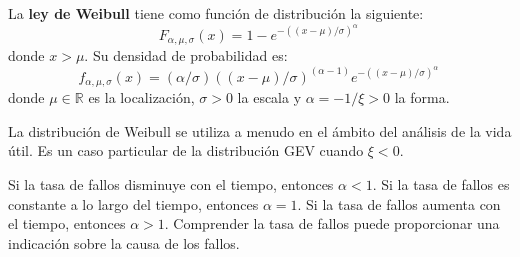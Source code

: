 \begin{f}
	
	
	La \textbf{ley de Weibull} tiene como función de distribución la siguiente:
	\[
	F_{\alpha,\mu, \sigma}(x) = 1- e^{-((x-\mu)/\sigma)^\alpha}\,
	\]
	donde \(x >\mu\).
	Su densidad de probabilidad es:
	\[
	f_{\alpha,\mu,\sigma}(x) = (\alpha/\sigma) ((x-\mu)/\sigma)^{(\alpha-1)} e^{-((x-\mu)/\sigma)^\alpha}\,
	\]
	donde  \(\mu\in\mathbb{R}\) es la localización, \(\sigma>0\) la escala y  \(\alpha=-1/\xi>0 \) la forma.
	
	La distribución de Weibull se utiliza a menudo en el ámbito del análisis de la vida útil. Es un caso particular de la distribución GEV cuando \(\xi<0\).
	
	Si la tasa de fallos disminuye con el tiempo, entonces \(\alpha<1\). Si la tasa de fallos es constante a lo largo del tiempo, entonces \(\alpha=1\). Si la tasa de fallos aumenta con el tiempo, entonces \(\alpha>1\). Comprender la tasa de fallos puede proporcionar una indicación sobre la causa de los fallos.
	

\begin{center}

\end{center}
\end{f}


